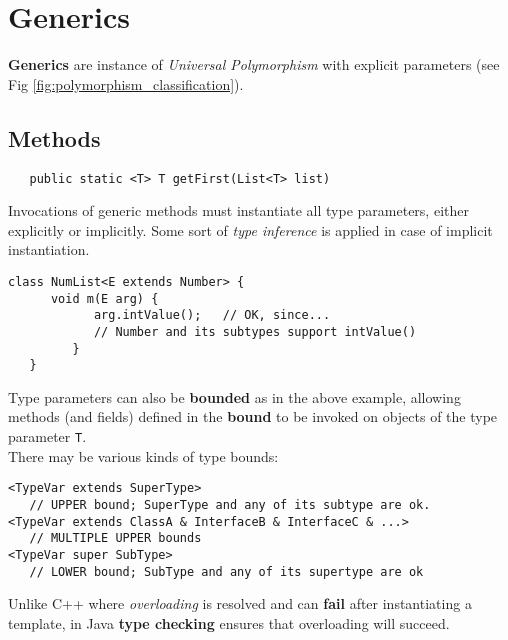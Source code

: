 \chapter{Generics}
\textbf{Generics} are instance of \textit{Universal Polymorphism} with explicit parameters (see Fig \ref{fig:polymorphism_classification}).

\section{Methods}
\begin{lstlisting}
   public static <T> T getFirst(List<T> list)
\end{lstlisting}
Invocations of generic methods must instantiate all
type parameters, either explicitly or implicitly.
Some sort of \textit{type inference} is applied in case of implicit instantiation.

\begin{lstlisting}
class NumList<E extends Number> {
      void m(E arg) {
            arg.intValue();   // OK, since...
            // Number and its subtypes support intValue()
         }
   }
\end{lstlisting}

Type parameters can also be \textbf{bounded} as in the above example,
allowing methods (and fields) defined in the \textbf{bound} to be invoked on objects of the type parameter \lstinline|T|.\\
There may be various kinds of type bounds:
\begin{lstlisting}
<TypeVar extends SuperType>
   // UPPER bound; SuperType and any of its subtype are ok.
<TypeVar extends ClassA & InterfaceB & InterfaceC & ...>
   // MULTIPLE UPPER bounds
<TypeVar super SubType>
   // LOWER bound; SubType and any of its supertype are ok
\end{lstlisting}

Unlike C++ where \textit{overloading} is resolved and can \textbf{fail} after
instantiating a template, in Java \textbf{type checking} ensures that
overloading will succeed.

